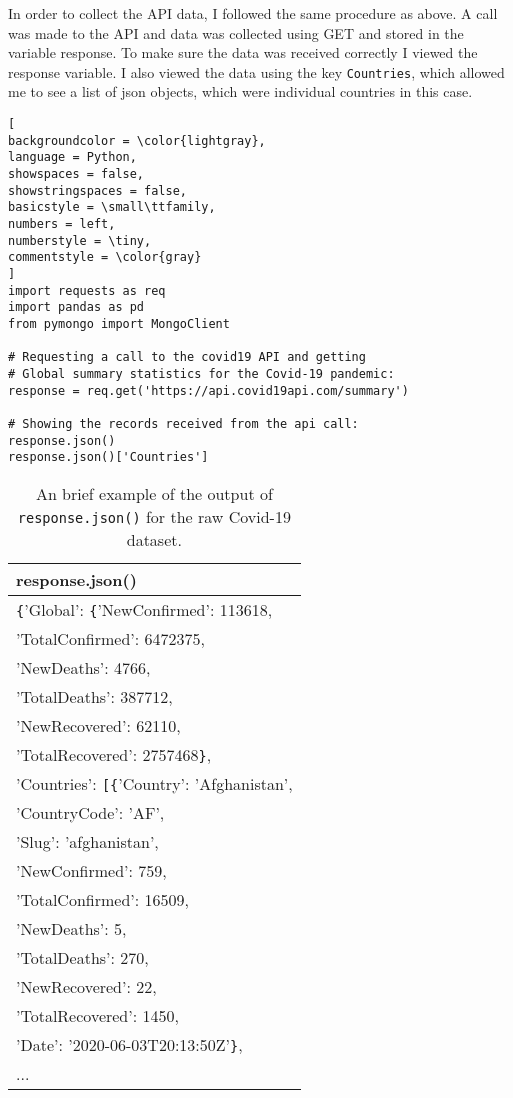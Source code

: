 \documentclass[]{article}
\newcommand{\code}[1]{\colorbox{light-gray}{\texttt{#1}}}
\begin{document}
In order to collect the API data, I followed the same procedure as above.   A call was made to the API and data was collected using GET and stored in the variable response.  To make sure the data was received correctly I viewed the response variable.  I also viewed the data using the key \code{Countries}, which allowed me to see a list of json objects, which were individual countries in this case.
 
\begin{lstlisting}[
backgroundcolor = \color{lightgray},
language = Python,
showspaces = false,
showstringspaces = false,
basicstyle = \small\ttfamily,
numbers = left,
numberstyle = \tiny,
commentstyle = \color{gray}
]
import requests as req
import pandas as pd
from pymongo import MongoClient

# Requesting a call to the covid19 API and getting
# Global summary statistics for the Covid-19 pandemic:
response = req.get('https://api.covid19api.com/summary')

# Showing the records received from the api call:
response.json()
response.json()['Countries']
\end{lstlisting}


\begin{table}[!ht]
	\begin{center}
		\caption{An brief example of the output of \code{response.json()} for the raw Covid-19 dataset.}
		\label{tab:table1}
		\begin{tabular}{|l|} 
			\hline
			\textbf{response.json()} \\
			\hline
			\verb|{|'Global': \verb|{|'NewConfirmed': 113618,\\
					'TotalConfirmed': 6472375,\\
					'NewDeaths': 4766,\\
					'TotalDeaths': 387712,\\
					'NewRecovered': 62110,\\
					'TotalRecovered': 2757468\verb|}|,\\
				'Countries': \verb|[{|'Country': 'Afghanistan',\\
					'CountryCode': 'AF',\\
					'Slug': 'afghanistan',\\
					'NewConfirmed': 759,\\
					'TotalConfirmed': 16509,\\
					'NewDeaths': 5,\\
					'TotalDeaths': 270,\\
					'NewRecovered': 22,\\
					'TotalRecovered': 1450,\\
					'Date': '2020-06-03T20:13:50Z'\verb|}|,\\
					...\\

			\hline
		\end{tabular}
	\end{center}
\end{table}
\end{document}
